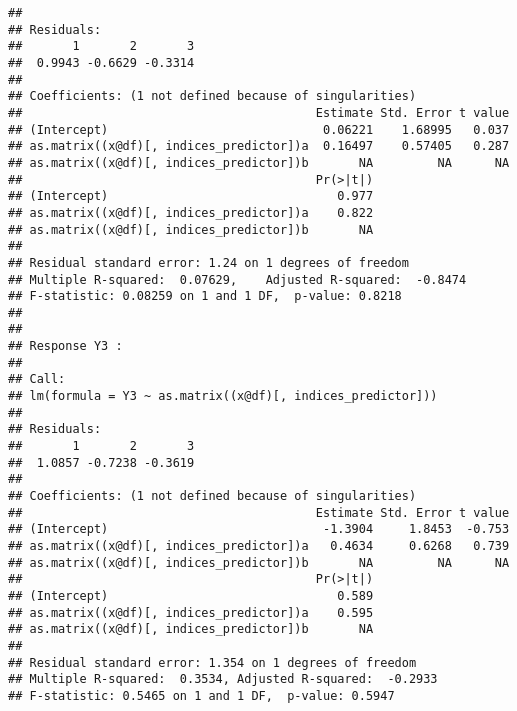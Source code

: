 \documentclass{article}\usepackage[]{graphicx}\usepackage[]{color}
\makeatletter
\newenvironment{kframe}{%
 \def\at@end@of@kframe{}%
 \ifinner\ifhmode%
  \def\at@end@of@kframe{\end{minipage}}%
  \begin{minipage}{\columnwidth}%
 \fi\fi%
 \def\FrameCommand##1{\hskip\@totalleftmargin \hskip-\fboxsep
 \colorbox{shadecolor}{##1}\hskip-\fboxsep
     \hskip-\linewidth \hskip-\@totalleftmargin \hskip\columnwidth}%
 \MakeFramed {\advance\hsize-\width
   \@totalleftmargin\z@ \linewidth\hsize
   \@setminipage}}%
 {\par\unskip\endMakeFramed%
 \at@end@of@kframe}
\newenvironment{knitrout}{}{} %
\makeatother
\begin{document}
\begin{knitrout}
\begin{kframe}
\begin{verbatim}
## 
## Residuals:
##       1       2       3 
##  0.9943 -0.6629 -0.3314 
## 
## Coefficients: (1 not defined because of singularities)
##                                         Estimate Std. Error t value
## (Intercept)                              0.06221    1.68995   0.037
## as.matrix((x@df)[, indices_predictor])a  0.16497    0.57405   0.287
## as.matrix((x@df)[, indices_predictor])b       NA         NA      NA
##                                         Pr(>|t|)
## (Intercept)                                0.977
## as.matrix((x@df)[, indices_predictor])a    0.822
## as.matrix((x@df)[, indices_predictor])b       NA
## 
## Residual standard error: 1.24 on 1 degrees of freedom
## Multiple R-squared:  0.07629,	Adjusted R-squared:  -0.8474 
## F-statistic: 0.08259 on 1 and 1 DF,  p-value: 0.8218
## 
## 
## Response Y3 :
## 
## Call:
## lm(formula = Y3 ~ as.matrix((x@df)[, indices_predictor]))
## 
## Residuals:
##       1       2       3 
##  1.0857 -0.7238 -0.3619 
## 
## Coefficients: (1 not defined because of singularities)
##                                         Estimate Std. Error t value
## (Intercept)                              -1.3904     1.8453  -0.753
## as.matrix((x@df)[, indices_predictor])a   0.4634     0.6268   0.739
## as.matrix((x@df)[, indices_predictor])b       NA         NA      NA
##                                         Pr(>|t|)
## (Intercept)                                0.589
## as.matrix((x@df)[, indices_predictor])a    0.595
## as.matrix((x@df)[, indices_predictor])b       NA
## 
## Residual standard error: 1.354 on 1 degrees of freedom
## Multiple R-squared:  0.3534,	Adjusted R-squared:  -0.2933 
## F-statistic: 0.5465 on 1 and 1 DF,  p-value: 0.5947
\end{verbatim}
\end{kframe}
\end{knitrout}
\end{document}
